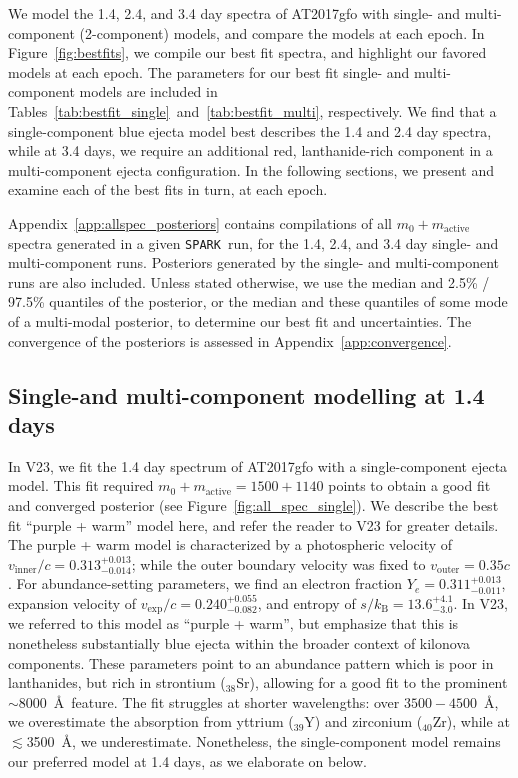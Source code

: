 \documentclass[twocolumn,twocolappendix]{aastex63}
\def\SPARK{\texttt{SPARK}}
\begin{document}
We model the 1.4, 2.4, and 3.4 day spectra of AT2017gfo with single- and multi-component (2-component) models, and compare the models at each epoch. In Figure~\ref{fig:bestfits}, we compile our best fit spectra, and highlight our favored models at each epoch. The parameters for our best fit single- and multi-component models are included in Tables~\ref{tab:bestfit_single}~and~\ref{tab:bestfit_multi}, respectively. We find that a single-component blue ejecta model best describes the 1.4 and 2.4 day spectra, while at 3.4 days, we require an additional red, lanthanide-rich component in a multi-component ejecta configuration. In the following sections, we present and examine each of the best fits in turn, at each epoch. 

Appendix~\ref{app:allspec_posteriors} contains compilations of all $m_0 + m_{\mathrm{active}}$ spectra generated in a given \SPARK~run, for the 1.4, 2.4, and 3.4 day single- and multi-component runs. Posteriors generated by the single- and multi-component runs are also included. Unless stated otherwise, we use the median and 2.5\% / 97.5\% quantiles of the posterior, or the median and these quantiles of some mode of a multi-modal posterior, to determine our best fit and uncertainties. The convergence of the posteriors is assessed in Appendix~\ref{app:convergence}.



\subsection{Single-and multi-component modelling at 1.4 days}\label{ssc:1.4}

In V23, we fit the 1.4 day spectrum of AT2017gfo with a single-component ejecta model. This fit required $m_0 + m_{\mathrm{active}} = 1500 + 1140$ points to obtain a good fit and converged posterior (see Figure~\ref{fig:all_spec_single}). We describe the best fit ``purple + warm'' model here, and refer the reader to V23 for greater details. The purple + warm model is characterized by a photospheric velocity of $v_{\mathrm{inner}}/c = 0.313^{+0.013}_{-0.014}$; while the outer boundary velocity was fixed to $v_{\mathrm{outer}} = 0.35c$. For abundance-setting parameters, we find an electron fraction $Y_e = 0.311^{+0.013}_{-0.011}$, expansion velocity of $v_{\mathrm{exp}}/c = 0.240^{+0.055}_{-0.082}$, and entropy of $s / k_{\mathrm{B}} = 13.6^{+4.1}_{-3.0}$. In V23, we referred to this model as ``purple + warm'', but emphasize that this is nonetheless substantially blue ejecta within the broader context of kilonova components. These parameters point to an abundance pattern which is poor in lanthanides, but rich in strontium (${}_{38}$Sr), allowing for a good fit to the prominent $\sim$8000~\AA~feature. The fit struggles at shorter wavelengths: over $3500-4500$~\AA, we overestimate the absorption from yttrium (${}_{39}$Y) and zirconium (${}_{40}$Zr), while at $\lesssim$3500~\AA, we underestimate. Nonetheless, the single-component model remains our preferred model at 1.4 days, as we elaborate on below.
\end{document}
